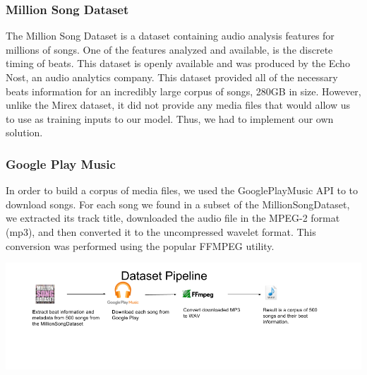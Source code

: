 \subsubsection{Million Song Dataset}

The Million Song Dataset is a dataset containing audio analysis features for millions of songs. One of the features analyzed and available, is the discrete timing of beats. This dataset is openly available and was produced by the Echo Nost, an audio analytics company. This dataset provided all of the necessary beats information for an incredibly large corpus of songs, 280GB in size. However, unlike the Mirex dataset, it did not provide any media files that would allow us to use as training inputs to our model. Thus, we had to implement our own solution.

\subsubsection{Google Play Music}

In order to build a corpus of media files, we used the GooglePlayMusic API to to download songs. For each song we found in a subset of the MillionSongDataset, we extracted its track title, downloaded the audio file in the MPEG-2 format (mp3), and then converted it to the uncompressed wavelet format. This conversion was performed using the popular FFMPEG utility. 
\begin{center}
	\includegraphics[scale=0.55]{dataset_flow.png}
\end{center}